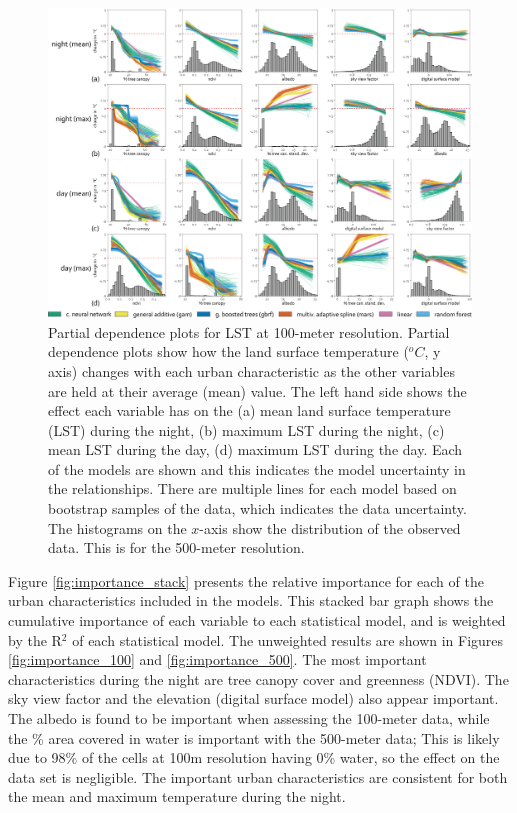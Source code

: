 \documentclass[final,3p,times,onecolumn,sort&compress]{elsarticle}
\begin{document}
\begin{figure}
    \centering
    \includegraphics[width=\linewidth]{fig/report/pdp_100.png}
    \caption[Partial dependence plots for LST at 100-meter resolution]{
    Partial dependence plots for LST at 100-meter resolution.
    Partial dependence plots show how the land surface temperature ($^oC$, y axis) changes with each urban characteristic as the other variables are held at their average (mean) value. 
    The left hand side shows the effect each variable has on the (a) mean land surface temperature (LST) during the night, (b) maximum LST during the night, (c) mean LST during the day, (d) maximum LST during the day. 
    Each of the models are shown and this indicates the model uncertainty in the relationships.
    There are multiple lines for each model based on bootstrap samples of the data, which indicates the data uncertainty.
    The histograms on the $x$-axis show the distribution of the observed data.
    This is for the 500-meter resolution.
    }
    \label{fig:pdp_100}
\end{figure}

Figure \ref{fig:importance_stack} presents the relative importance for each of the urban characteristics included in the models.
This stacked bar graph shows the cumulative importance of each variable to each statistical model, and is weighted by the R$^2$ of each statistical model.
The unweighted results are shown in Figures \ref{fig:importance_100} and \ref{fig:importance_500}.
The most important characteristics during the night are tree canopy cover and greenness (NDVI).
The sky view factor and the elevation (digital surface model) also appear important. 
The albedo is found to be important when assessing the 100-meter data, while the \% area covered in water is important with the 500-meter data; 
This is likely due to 98\% of the cells at 100m resolution having 0\% water, so the effect on the data set is negligible.
The important urban characteristics are consistent for both the mean and maximum temperature during the night.
\end{document}
